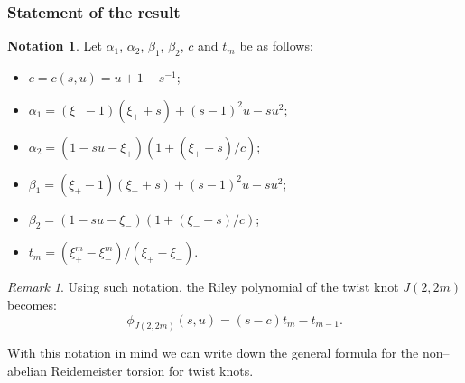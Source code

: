 \documentclass[a4paper]{amsart}
\theoremstyle{plain}
\theoremstyle{definition}
\newtheorem*{notation*}{Notation}
\theoremstyle{remark}
\newtheorem{remark}{Remark}%
\begin{document}
\subsubsection{Statement of the result}
\label{statement}

\begin{notation*}
Let $\alpha_1$, $\alpha_2$, $\beta_1$, $\beta_2$, $c$ and  $t_m$ be as follows:
\begin{itemize}
\item[] $c = c(s,u) = u+1-s^{-1}$; 
\item[] $\alpha_1 = (\xi_{-} - 1)(\xi_{+} + s) + (s-1)^2 u-su^2$; 
\item[] $\alpha_2 =  (1-su-\xi_{+})\left(1+ (\xi_{+} - s)/c\right)$; 
\item[] $\beta_1  = (\xi_{+}-1)(\xi_{-} + s) + (s-1)^2 u-su^2$;
\item[] $\beta_2  =  (1-su-\xi_{-})\left(1+(\xi_{-} - s)/c \right)$;
\item[] $t_m  = (\xi_{+}^m -\xi_{-}^m)/(\xi_{+} -\xi_{-})$.
\end{itemize}
\end{notation*}

\begin{remark}
Using such notation, the Riley polynomial of the twist knot $J(2, 2m)$ becomes:
\[
\phi_{J(2, 2m)} (s,u)
=
(s-c)t_m - t_{m-1}.
\]
\end{remark}

With this notation in mind we can write down the general formula for the non--abelian Reidemeister torsion for twist knots.
\end{document}

